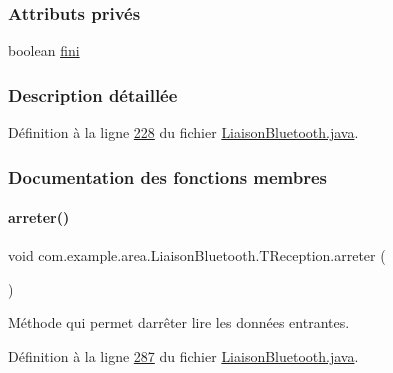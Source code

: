 \subsubsection*{Attributs privés}
\begin{DoxyCompactItemize}
\item 
boolean \hyperlink{classcom_1_1example_1_1area_1_1_liaison_bluetooth_1_1_t_reception_a7f942e7af3e97af754f2591d2bd20435}{fini}
\end{DoxyCompactItemize}


\subsubsection{Description détaillée}


Définition à la ligne \hyperlink{_liaison_bluetooth_8java_source_l00228}{228} du fichier \hyperlink{_liaison_bluetooth_8java_source}{Liaison\+Bluetooth.\+java}.



\subsubsection{Documentation des fonctions membres}
\mbox{\label{classcom_1_1example_1_1area_1_1_liaison_bluetooth_1_1_t_reception_a89f97f22a976b8632e82b2aa94ab2674}} 
\paragraph{\texorpdfstring{arreter()}{arreter()}}
{\footnotesize\ttfamily void com.\+example.\+area.\+Liaison\+Bluetooth.\+T\+Reception.\+arreter (\begin{DoxyParamCaption}{ }\end{DoxyParamCaption})}



Méthode qui permet d\textquotesingle{}arrêter lire les données entrantes. 



Définition à la ligne \hyperlink{_liaison_bluetooth_8java_source_l00287}{287} du fichier \hyperlink{_liaison_bluetooth_8java_source}{Liaison\+Bluetooth.\+java}.



